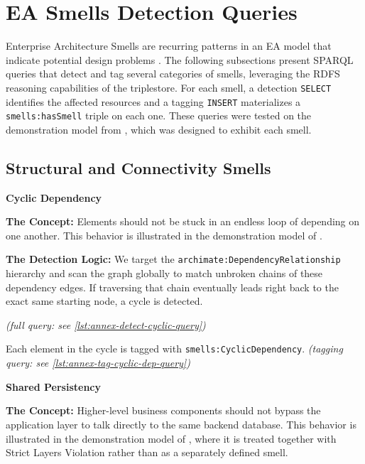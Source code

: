 \section{EA Smells Detection Queries}
\label{sec:smells}

Enterprise Architecture Smells are recurring patterns in an EA model that indicate potential design problems \parencite{salentin2020smells}. The following subsections present SPARQL queries that detect and tag several categories of smells, leveraging the RDFS reasoning capabilities of the triplestore. For each smell, a detection \texttt{SELECT} identifies the affected resources and a tagging \texttt{INSERT} materializes a \texttt{smells:hasSmell} triple on each one. These queries were tested on the demonstration model from \parencite{salentin2020smells}, which was designed to exhibit each smell.

\subsection{Structural and Connectivity Smells}
\label{subsec:structural-smells}

\noindent\textbf{Cyclic Dependency}\par

\textbf{The Concept:} Elements should not be stuck in an endless loop of depending on one another. This behavior is illustrated in the demonstration model of \parencite{salentin2020smells}.

\textbf{The Detection Logic:} We target the \texttt{archimate:DependencyRelationship} hierarchy and scan the graph globally to match unbroken chains of these dependency edges. If traversing that chain eventually leads right back to the exact same starting node, a cycle is detected.

\textit{(full query: see \autoref{lst:annex-detect-cyclic-query})}

Each element in the cycle is tagged with \texttt{smells:CyclicDependency}. \textit{(tagging query: see \autoref{lst:annex-tag-cyclic-dep-query})}

\noindent\textbf{Shared Persistency}\par

\textbf{The Concept:} Higher-level business components should not bypass the application layer to talk directly to the same backend database. This behavior is illustrated in the demonstration model of \parencite{salentin2020smells}, where it is treated together with Strict Layers Violation rather than as a separately defined smell.


